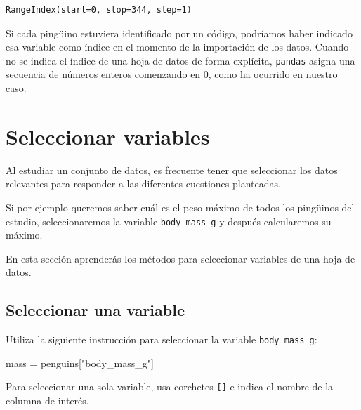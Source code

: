 \documentclass[
  a4paper,
  noprof,
  12pt,
  notoc,
  nosols,
  nobib]{mnye}
\newenvironment{Shaded}{\begin{snugshade}}{\end{snugshade}}
\newcommand{\NormalTok}[1]{\textcolor[rgb]{0.00,0.23,0.31}{#1}}
\newcommand{\OperatorTok}[1]{\textcolor[rgb]{0.37,0.37,0.37}{#1}}
\newcommand{\StringTok}[1]{\textcolor[rgb]{0.13,0.47,0.30}{#1}}
\theoremstyle{definition}
\theoremstyle{remark}
\begin{document}
\begin{verbatim}
RangeIndex(start=0, stop=344, step=1)
\end{verbatim}

Si cada pingüino estuviera identificado por un código, podríamos haber
indicado esa variable como índice en el momento de la importación de los
datos. Cuando no se indica el índice de una hoja de datos de forma
explícita, \texttt{pandas} asigna una secuencia de números enteros
comenzando en 0, como ha ocurrido en nuestro caso.


\hypertarget{sec-subset-variables}{%
\section{Seleccionar variables}\label{sec-subset-variables}}

Al estudiar un conjunto de datos, es frecuente tener que seleccionar los
datos relevantes para responder a las diferentes cuestiones planteadas.

Si por ejemplo queremos saber cuál es el peso máximo de todos los
pingüinos del estudio, seleccionaremos la variable
\texttt{body\_mass\_g} y después calcularemos su máximo.

En esta sección aprenderás los métodos para seleccionar variables de una
hoja de datos.

\hypertarget{sec-subset-one-variable}{%
\subsection{Seleccionar una variable}\label{sec-subset-one-variable}}

Utiliza la siguiente instrucción para seleccionar la variable
\texttt{body\_mass\_g}:

\begin{Shaded}
\begin{Highlighting}[]
\NormalTok{mass }\OperatorTok{=}\NormalTok{ penguins[}\StringTok{"body\_mass\_g"}\NormalTok{]}
\end{Highlighting}
\end{Shaded}

\begin{tcolorbox}[enhanced jigsaw, arc=.35mm, colback=white, colframe=quarto-callout-note-color-frame, breakable, opacityback=0, bottomrule=.15mm, rightrule=.15mm, left=2mm, toprule=.15mm, leftrule=.75mm]
\begin{minipage}[t]{5.5mm}
\textcolor{quarto-callout-note-color}{\faInfo}
\end{minipage}%
\begin{minipage}[t]{\textwidth - 5.5mm}

Para seleccionar una sola variable, usa corchetes \texttt{{[}{]}} e
indica el nombre de la columna de interés.

\end{minipage}%
\end{tcolorbox}
\end{document}
